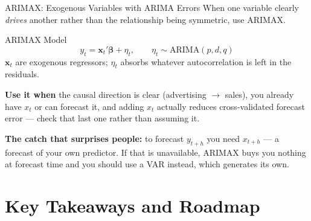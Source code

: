 \documentclass[aspectratio=169, 11pt]{beamer}
\begin{document}
\begin{frame}{ARIMAX: Exogenous Variables with ARIMA Errors}
  When one variable clearly \emph{drives} another rather than the relationship being
  symmetric, use ARIMAX.
  \begin{definitionbox}{ARIMAX Model}
    \[
      y_t = \mathbf{x}_t'\boldsymbol{\beta} + \eta_t,
      \qquad \eta_t \sim \mathrm{ARIMA}(p,d,q)
    \]
    $\mathbf{x}_t$ are exogenous regressors; $\eta_t$ absorbs whatever autocorrelation is
    left in the residuals.
  \end{definitionbox}
  \textbf{Use it when} the causal direction is clear (advertising $\to$ sales), you already
  have $x_t$ or can forecast it, and adding $x_t$ actually reduces cross-validated forecast
  error --- check that last one rather than assuming it.

  \vspace{0.15cm}
  \textbf{The catch that surprises people:} to forecast $y_{t+h}$ you need
  $x_{t+h}$ --- a forecast of your own predictor. If that is unavailable, ARIMAX buys you
  nothing at forecast time and you should use a VAR instead, which generates its own.

  \vspace{0.1cm}
\end{frame}

\section{Key Takeaways and Roadmap}

\end{document}
